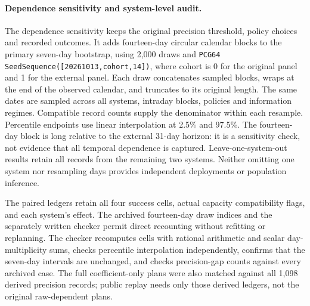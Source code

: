 \paragraph{Dependence sensitivity and system-level audit.}
The dependence sensitivity keeps the original precision threshold, policy
choices and recorded outcomes. It adds fourteen-day circular calendar blocks
to the primary seven-day bootstrap, using 2,000 draws and
\texttt{PCG64 SeedSequence([20261013,cohort,14])}, where cohort is 0 for the
original panel and 1 for the external panel. Each draw concatenates sampled
blocks, wraps at the end of the observed calendar, and truncates to its
original length. The same dates are sampled across all systems, intraday
blocks, policies and information regimes. Compatible record counts supply
the denominator within each resample. Percentile endpoints use linear
interpolation at 2.5\% and 97.5\%. The fourteen-day block is long relative
to the external 31-day horizon: it is a sensitivity check, not evidence that
all temporal dependence is captured. Leave-one-system-out results retain all
records from the remaining two systems. Neither omitting one system nor
resampling days provides independent deployments or population inference.

The paired ledgers retain all four success cells, actual capacity compatibility
flags, and each system's effect. The archived fourteen-day draw indices and
the separately written checker permit direct recounting without refitting or
replanning. The checker recomputes cells with rational arithmetic and scalar
day-multiplicity sums, checks percentile interpolation independently, confirms
that the seven-day intervals are unchanged, and checks precision-gap counts
against every archived case. The full coefficient-only plans were also matched
against all 1,098 derived precision records; public replay needs only those
derived ledgers, not the original raw-dependent plans.
